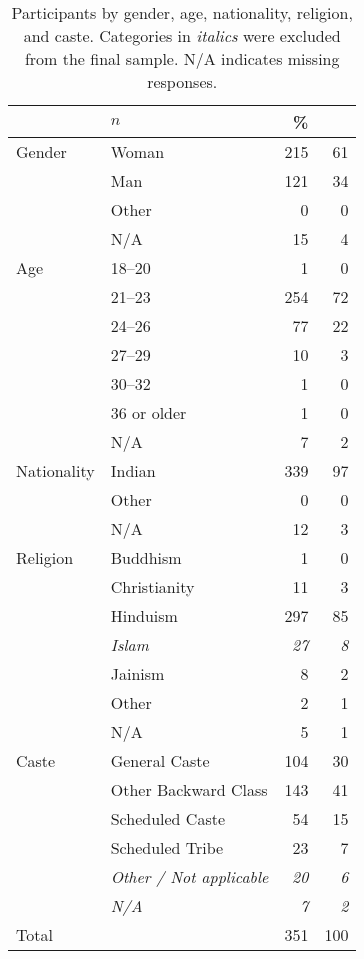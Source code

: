 \documentclass[12pt,a4paper]{article}
\begin{document}
\begin{table}[h]
\caption[Participants by gender, age, nationality, religion, and caste]{Participants by gender, age, nationality, religion, and caste. Categories in \textit{italics} were excluded from the final sample. N/A indicates missing responses.}
\centering
{}
\small	
\begin{tabular}{llrr} \addlinespace \toprule
\multicolumn{2}{l}{Category} & $n$ & \% \\ \midrule \addlinespace 
Gender      & Woman      & 215 & 61 \\
            & Man & 121 & 34 \\
            & Other & 0 & 0 \\
            & N/A & 15 & 4 \\ \addlinespace \addlinespace
Age         & 18--20 & 1 & 0 \\
            & 21--23 & 254 & 72 \\
            & 24--26 &  77 & 22 \\
            & 27--29 &  10 &  3 \\
            & 30--32 &   1 &  0 \\
            & 36 or older & 1 & 0 \\ 
            & N/A & 7 & 2 \\ \addlinespace \addlinespace
Nationality & Indian & 339 & 97 \\
            & Other & 0 & 0 \\
            & N/A & 12 & 3 \\ \addlinespace \addlinespace
Religion    & Buddhism & 1 & 0 \\ 
            & Christianity & 11 & 3 \\ 
            & Hinduism & 297 & 85 \\ 
            & \textit{Islam} & \textit{27} & \textit{8} \\ 
            & Jainism & 8 & 2 \\ 
            & Other & 2 & 1 \\ 
            & N/A & 5 & 1 \\ \addlinespace \addlinespace
Caste       & General Caste & 104 & 30 \\ 
            & Other Backward Class & 143 & 41 \\ 
            & Scheduled Caste & 54 & 15 \\ 
            & Scheduled Tribe & 23 & 7 \\ 
            & \textit{Other / Not applicable} & \textit{20} & \textit{6} \\ 
            & \textit{N/A} & \textit{7} & \textit{2} \\ \addlinespace \midrule
Total       &   & 351 & 100 \\ \bottomrule
\end{tabular}
\label{tab:ch4-s4-1}
\end{table}
\end{document}
